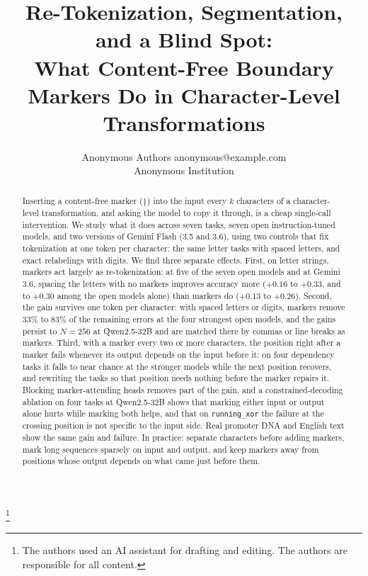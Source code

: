 \documentclass[10pt]{article} %
\title{Re-Tokenization, Segmentation, and a Blind Spot:\\
What Content-Free Boundary Markers Do in Character-Level Transformations}
\author{\name Anonymous Authors \email anonymous@example.com \\
      \addr Anonymous Institution}
\newcommand{\task}[1]{\texttt{#1}}
\newcommand\blfootnote[1]{%
  \begingroup\renewcommand\thefootnote{}\footnote{#1}%
  \addtocounter{footnote}{-1}\endgroup}
\begin{document}
\maketitle

\begin{abstract}
Inserting a content-free marker (\texttt{|}) into the input every $k$ characters of a character-level transformation, and asking the model to copy it through, is a cheap single-call intervention. We study what it does across seven tasks, seven open instruction-tuned models, and two versions of Gemini Flash (3.5 and 3.6), using two controls that fix tokenization at one token per character: the same letter tasks with spaced letters, and exact relabelings with digits. We find three separate effects. First, on letter strings, markers act largely as re-tokenization: at five of the seven open models and at Gemini 3.6, spacing the letters with no markers improves accuracy more ($+0.16$ to $+0.33$, and to $+0.30$ among the open models alone) than markers do ($+0.13$ to $+0.26$). Second, the gain survives one token per character: with spaced letters or digits, markers remove 33\% to 83\% of the remaining errors at the four strongest open models, and the gains persist to $N = 256$ at Qwen2.5-32B and are matched there by commas or line breaks as markers. Third, with a marker every two or more characters, the position right after a marker fails whenever its output depends on the input before it: on four dependency tasks it falls to near chance at the stronger models while the next position recovers, and rewriting the tasks so that position needs nothing before the marker repairs it. Blocking marker-attending heads removes part of the gain, and a constrained-decoding ablation on four tasks at Qwen2.5-32B shows that marking either input or output alone hurts while marking both helps, and that on \task{running\_xor} the failure at the crossing position is not specific to the input side. Real promoter DNA and English text show the same gain and failure. In practice: separate characters before adding markers, mark long sequences sparsely on input and output, and keep markers away from positions whose output depends on what came just before them.
\end{abstract}

\blfootnote{The authors used an AI assistant for drafting and editing. The authors are responsible for all content.}
\end{document}
